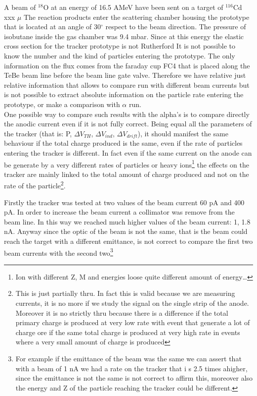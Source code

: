 \documentclass[a4paper, 11 pt]{report}
\newcommand{\Vind}{$\Delta V_{ind}$}
\newcommand{\Vthgem}{$\Delta V_{TH}$}
\newcommand{\Vdrift}{$ \Delta V_{drift}$}
\begin{document}
A beam of $^{18}$O at an energy of 16.5 AMeV have been sent on a target of $^{116}$Cd xxx $\mu$
The reaction products enter the scattering chamber housing the prototype that is located at an 
angle of 30$^{\circ}$ respect to the beam direction. The pressure of isobutane inside the gas
 chamber was 9.4 mbar.
Since at this energy the elastic cross section for the tracker prototype is not Rutherford It is 
not possible to know the number and the kind of particles entering the prototype. The only 
information on the flux comes from the faraday cup FC4 that is placed along the TeBe beam line 
before the beam line gate valve. Therefore we have relative just relative information
that allows to compare run with different beam currents but is not possible to extract
absolute information on the particle rate entering the prototype, or make a comparison with
$\alpha$ run.\\
One possible way to compare such results with the alpha's is to compare directly the 
anodic current even if it is not fully correct.
Being equal all the parameters of the tracker (that is: P, \Vthgem{}, \Vind{}, \Vdrift{}),
it should manifest the same behaviour if the total charge produced is the same, even if the 
rate of particles entering the tracker is different.
In fact even if the same current on the anode can be generate by a very different rates 
of particles or heavy ions\footnote{Ion with different Z, M and energies loose quite different
amount of energy\ldots} the effects on the tracker are mainly linked to the total amount of 
charge produced and not on the rate of the particle\footnote{This is just partially thru. In fact 
this is valid because we are measuring currents, it is no more if we study the signal on the 
single strip of the anode. Moreover it is no strictly thru because there is a difference if
the total primary charge is produced at very low rate with event that generate a lot of charge
ore if the same total charge is produced at very high rate in events where a very small amount of 
charge is produced}.

Firstly the tracker was tested  at two values of the beam current 60 pA and 400 pA.
In order to increase the beam current a collimator was remove from the beam line. In this way 
we reached much higher values of the beam current: 1, 1.8 nA. Anyway since the 
optic of the beam is not the same, that is the beam could reach the target with a different 
emittance, is not correct to compare the first two beam currents
with the second two\footnote{For example if the emittance of the beam was the same we can
assert that with a beam of 1 nA we had a rate on the tracker that i s 2.5 times ahigher,
since the emittance is not the same is not correct to affirm this, moreover also 
the energy and Z of the particle reaching the tracker could be different.}
\end{document}
